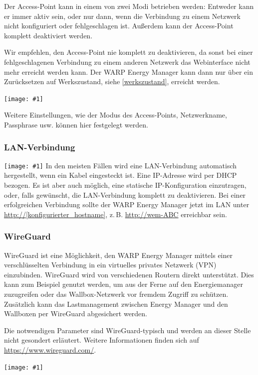 \documentclass[a4paper,10pt]{article}
\newcommand{\hint}[1]{\begin{tcolorbox}[colback=boxgray,colframe=black,coltext=
white,title=Hinweis,left*=2mm,right*=2mm,boxsep=1mm,bottom=1mm,top=1mm]#1\end{tcolorbox}}
\newcommand{\gfx}[1]{\texttt{[image: \#1]}}
\begin{document}
\begin{multicols*}{2}
	Der Access-Point kann in einem von zwei Modi betrieben werden: Entweder kann er immer aktiv sein,
	oder nur dann, wenn die Verbindung zu einem Netzwerk nicht konfiguriert oder fehlgeschlagen ist.
	Außerdem kann der Access-Point komplett deaktiviert werden.

	\hint{Wir empfehlen, den Access-Point nie komplett zu deaktivieren, da sonst bei einer
		fehlgeschlagenen Verbindung zu einem anderen Netzwerk das Webinterface nicht mehr erreicht
		werden kann. Der WARP Energy Manager kann dann nur über ein Zurücksetzen auf Werkszustand, siehe \ref{werkszustand}, erreicht werden.}

	\gfx{./img/resized/web_wifi_ap}


	Weitere Einstellungen, wie der Modus des Access-Points,
	Netzwerkname, Passphrase usw. können hier festgelegt werden.

	\subsubsection{LAN-Verbindung}
	\gfx{./img/resized/web_ethernet}
	In den meisten Fällen wird eine
	LAN-Verbindung automatisch hergestellt, wenn ein Kabel eingesteckt ist.
	Eine IP-Adresse wird per DHCP bezogen. Es ist aber auch möglich,
	eine statische IP-Konfiguration	einzutragen, oder, falls gewünscht, die LAN-Verbindung
	komplett zu deaktivieren.
	Bei einer erfolgreichen Verbindung sollte der WARP Energy Manager jetzt im LAN unter
	\url{http://[konfigurierter_hostname]}, z.\,B. \url{http://wem-ABC} erreichbar sein.

	\subsubsection{WireGuard}

	WireGuard ist eine Möglichkeit, den WARP Energy Manager mittels einer verschlüsselten
	Verbindung in ein virtuelles privates Netzwerk (VPN) einzubinden. WireGuard wird von
	verschiedenen Routern direkt unterstützt. Dies kann zum Beispiel genutzt
	werden, um aus der Ferne auf den Energiemanager zuzugreifen oder das
	Wallbox-Netzwerk vor fremdem Zugriff zu schützen. Zusätzlich kann das
	Lastmanagement zwischen Energy Manager und den Wallboxen per WireGuard abgesichert werden.

	Die notwendigen Parameter sind WireGuard-typisch und werden an dieser Stelle
	nicht gesondert erläutert. Weitere Informationen finden sich auf
	\url{https://www.wireguard.com/}.

	\gfx{./img/resized/web_wireguard}


\end{multicols*}
\end{document}
